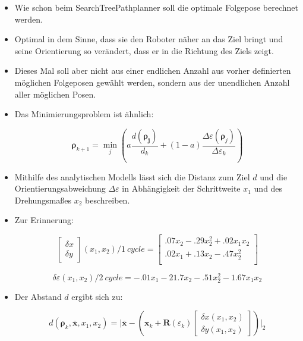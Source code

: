 \documentclass[10pt,a4paper]{article}
\begin{document}
\begin{itemize}
	\item Wie schon beim SearchTreePathplanner soll die optimale Folgepose berechnet werden.
	\item Optimal in dem Sinne, dass sie den Roboter näher an das Ziel bringt und seine Orientierung so verändert, dass er in die Richtung des Ziels zeigt.
	\item Dieses Mal soll aber nicht aus einer endlichen Anzahl aus vorher definierten möglichen Folgeposen gewählt werden, sondern aus der unendlichen Anzahl aller möglichen Posen.
	\item Das Minimierungsproblem ist ähnlich:
	
	\begin{equation}
	\bm{\rho}_{k+1} = \min_{j} \left( a \frac{d(\bm{\rho_j})}{d_k} + (1-a)\frac{\Delta \varepsilon (\bm{\rho}_j)}{\Delta \varepsilon_k} \right)	
	\end{equation}
	
	\item Mithilfe des analytischen Modells lässt sich die Distanz zum Ziel $d$ und die Orientierungsabweichung $\Delta \varepsilon$ in Abhängigkeit der Schrittweite $x_1$ und des Drehungsmaßes $x_2$ beschreiben.
	
	\item Zur Erinnerung:
	
		\begin{equation}
		\begin{bmatrix}	\delta x \\ \delta y \end{bmatrix} (x_1, x_2) / 1~cycle = \begin{bmatrix}
		.07x_2 - .29 x_2^2 + .02 x_1x_2 \\
		.02x_1 + .13x_2 - .47x_2^2 \\
		\end{bmatrix}
		\end{equation}
		
		\begin{equation}
		\delta \varepsilon (x_1, x_2) / {2~cycle} = -.01x_1 - 21.7 x_2 -.51 x_2^2 - 1.67x_1x_2
		\end{equation}
	
	\item Der Abstand $d$ ergibt sich zu:
	
	\begin{equation}
	d(\bm{\rho}_k, \bar{\bm{x}}, x_1, x_2) = \bigg| \bar{\bm{x}} - \left(\bm{x}_{k} + \bm{R}(\varepsilon_k)\begin{bmatrix}
	\delta x(x_1, x_2) \\ \delta y (x_1, x_2)
\end{bmatrix}	 \right)\bigg|_2
	\end{equation}	
	

\end{itemize}
\end{document}
